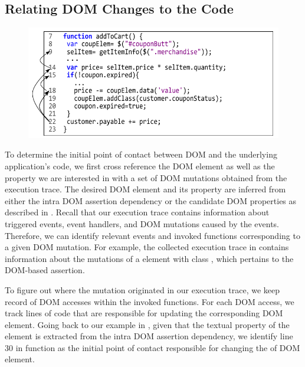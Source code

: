 \subsection{Relating DOM Changes to the Code} \label{Sec:domToCode}
%
\begin{figure}[!t]
  \centering
  \includegraphics[width=1\hsize]{fig/intraCodeDep}
  \vspace{-0.3in} 
  \label{Fig:intraCodeDep}
  \vspace{-0.2in} 
\end{figure}
To determine the initial point of contact between DOM and the underlying application's code, we first cross reference the DOM element as well as the property we are interested in with a set of DOM mutations obtained from the execution trace. The desired DOM element and its property are inferred from either the intra DOM assertion dependency or the candidate DOM properties as described in . Recall that our execution trace contains information about triggered events, event handlers, and DOM mutations caused by the events. Therefore, we can identify relevant events and invoked functions corresponding to a given DOM mutation.
For example, the collected execution trace in  contains information about the mutations of a  element with class , which pertains to the DOM-based assertion.

To figure out where the mutation originated in our execution trace, we keep record of DOM accesses within the invoked functions. For each DOM access, we track \javascript lines of code that are responsible for updating the corresponding DOM element. Going back to our example in , given that the textual property of the  element is extracted from the intra DOM assertion dependency, we identify line 30 in function  as the initial point of contact responsible for changing the  of DOM element.

